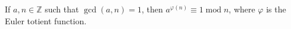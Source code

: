 \documentclass[12pt]{article}
\begin{document}
If $a,n \in \mathbb{Z}$ such that $\gcd(a,n)=1$, then $a^{\varphi (n)} \equiv 1 \operatorname{mod} n$, where $\varphi$ is the Euler totient function.
\end{document}
